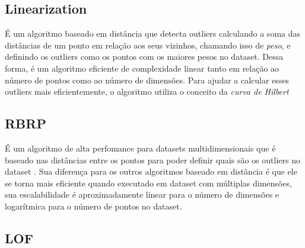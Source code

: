 \subsection{Linearization}


É um algoritmo baseado em distância \cite{10.1007/3-540-45681-3_2} que detecta outliers calculando a soma das distâncias de um ponto em relação aos seus vizinhos, chamando isso de \textit{peso}, e definindo os outliers como os pontos com os maiores pesos no dataset. Dessa forma, é um algoritmo eficiente de complexidade linear tanto em relação ao número de pontos como ao número de dimensões. Para ajudar a calcular esses outliers mais eficientemente, o algoritmo utiliza o conceito da \textit{curva de Hilbert}

\subsection{RBRP}


É um algoritmo de alta perfomance para datasets multidimensionais que é baseado nas distâncias entre os pontos para poder definir quais são os outliers no dataset \cite{Ghoting2006}. Sua diferença para os outros algoritmos baseado em distância é que ele se torna mais eficiente quando executado em dataset com múltiplas dimensões, sua escalabilidade é aproximadamente linear para o número de dimensões e logarítmica para o número de pontos no dataset.

\subsection{LOF}

